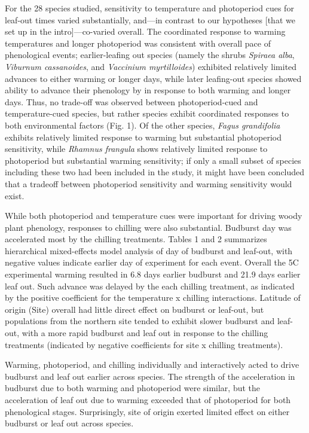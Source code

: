 \documentclass[12pt]{article}
\begin{document}
For the 28 species studied, sensitivity to temperature and photoperiod cues for leaf-out times varied substantially, and---in contrast to our hypotheses [that we set up in the intro]---co-varied overall. The coordinated response to warming temperatures and longer photoperiod was consistent with overall pace of phenological events; earlier-leafing out species (namely the shrubs \emph{Spiraea alba}, \emph{Viburnum cassanoides}, and \emph{Vaccinium myrtilloides}) exhibited relatively limited advances to either warming or longer days, while later leafing-out species showed ability to advance their phenology by in response to both warming and longer days. Thus, no trade-off was observed between photoperiod-cued and temperature-cued species, but rather species exhibit coordinated responses to both environmental factors (Fig. 1). Of the other species, \emph{Fagus grandifolia} exhibits relatively limited response to warming but substantial photoperiod sensitivity, while \emph{Rhamnus frangula} shows relatively limited response to photoperiod but substantial warming sensitivity; if only a small subset of species including these two had been included in the study, it might have been concluded that a tradeoff between photoperiod sensitivity and warming sensitivity would exist. %

While both photoperiod and temperature cues were important for driving woody plant phenology, responses to chilling were also substantial. Budburst day was accelerated most by the chilling treatments. Tables 1 and 2 summarizes hierarchical mixed-effects model analysis of day of budburst and leaf-out, with negative values indicate earlier day of experiment for each event. Overall the 5\degree C experimental warming resulted in 6.8 days earlier budburst and 21.9 days earlier leaf out. Such advance was delayed by the each chilling treatment, as indicated by the positive coefficient for the temperature x chilling interactions. Latitude of origin (Site) overall had little direct effect on budburst or leaf-out, but populations from the northern site tended to exhibit slower budburst and leaf-out, with a more rapid budburst and leaf out in response to the chilling treatments (indicated by negative coefficients for site x chilling treatments).

Warming, photoperiod, and chilling individually and interactively acted to drive budburst and leaf out earlier across species. The strength of the acceleration in budburst due to both warming and photoperiod were similar, but the acceleration of leaf out due to warming exceeded that of photoperiod for both phenological stages. Surprisingly, site of origin exerted limited effect on either budburst or leaf out across species. 
\end{document}
